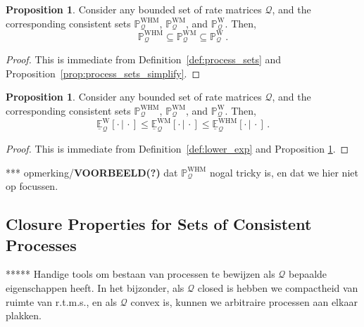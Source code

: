 \documentclass[10pt]{paper}
\theoremstyle{definition}
\newtheorem{proposition}[theorem]{Proposition}
\newcommand{\processes}{\mathbb{P}}
\newcommand{\wprocesses}{\processes^{\mathrm{W}}}
\newcommand{\wmprocesses}{\processes^{\mathrm{WM}}}
\newcommand{\whmprocesses}{\processes^{\mathrm{WHM}}}
\newcommand{\rateset}{\mathcal{Q}}
\begin{document}
\begin{proposition}\label{prop:markov_set_subset_of_nonmarkov_set}
Consider any bounded set of rate matrices $\rateset$, and the corresponding consistent sets $\whmprocesses_\rateset$, $\wmprocesses_\rateset$, and $\wprocesses_\rateset$.%
Then,
\begin{equation*}
\whmprocesses_\rateset \subseteq \wmprocesses_\rateset \subseteq \wprocesses_\rateset\,.
\end{equation*}
\end{proposition}
\begin{proof}
This is immediate from Definition~\ref{def:process_sets} and Proposition~\ref{prop:process_sets_simplify}.
\end{proof}

\begin{proposition}\label{prop:lower_exp_markov_bounded_by_nonmarkov}
Consider any bounded set of rate matrices $\rateset$, and the corresponding consistent sets $\whmprocesses_\rateset$, $\wmprocesses_\rateset$, and $\wprocesses_\rateset$.%
Then,
\begin{equation*}
\underline{\mathbb{E}}_\rateset^\mathrm{W}[\cdot\,\vert\,\cdot] \leq
\underline{\mathbb{E}}_\rateset^\mathrm{WM}[\cdot\,\vert\,\cdot] \leq
\underline{\mathbb{E}}_\rateset^\mathrm{WHM}[\cdot\,\vert\,\cdot]\,.
\end{equation*}
\end{proposition}
\begin{proof}
This is immediate from Definition~\ref{def:lower_exp} and Proposition \ref{prop:markov_set_subset_of_nonmarkov_set}.
\end{proof}

*** opmerking/{\bf VOORBEELD(?)} dat $\whmprocesses_\rateset$ nogal tricky is, en dat we hier niet op focussen.

\subsection{Closure Properties for Sets of Consistent Processes}

***** Handige tools om bestaan van processen te bewijzen als $\rateset$ bepaalde eigenschappen heeft. In het bijzonder, als $\rateset$ closed is hebben we compactheid van ruimte van r.t.m.s., en als $\rateset$ convex is, kunnen we arbitraire processen aan elkaar plakken.
\end{document}
